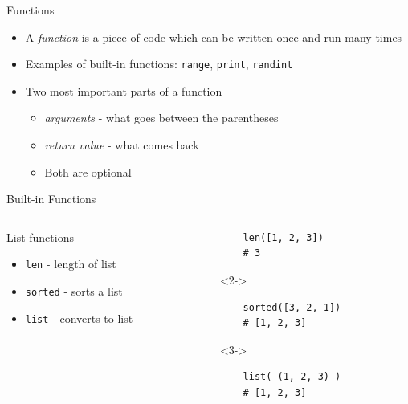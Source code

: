\documentclass{beamer}
\begin{document}
\begin{frame}{Functions}
    \begin{itemize}[<+->]
        \item A \textit{function} is a piece of code which can be written once and run many times
        \item Examples of built-in functions: \texttt{range}, \texttt{print}, \texttt{randint}
        \item Two most important parts of a function
            \begin{itemize}
                \item \textit{arguments} - what goes between the parentheses
                \item \textit{return value} - what comes back
                \item Both are optional
            \end{itemize}
    \end{itemize}
\end{frame}

\begin{frame}[fragile]{Built-in Functions}
    \begin{columns}
        \begin{column}{0.5\textwidth}
            List functions
            \begin{itemize}[<+->]
                \item \texttt{len} - length of list
                \item \texttt{sorted} - sorts a list
                \item \texttt{list} - converts to list 
            \end{itemize}
        \end{column}
        \begin{column}{0.5\textwidth}
        \small
\begin{block}{}
\begin{verbatim}
    len([1, 2, 3])
    # 3
\end{verbatim}
\end{block}
\vspace*{-1em}
\begin{block}<2->{}
\begin{verbatim}
    sorted([3, 2, 1])
    # [1, 2, 3]
\end{verbatim}
\end{block}
\begin{block}<3->{}
\vspace*{-1em}
\begin{verbatim}
    list( (1, 2, 3) )
    # [1, 2, 3]
\end{verbatim}
\end{block}
        \end{column}
    \end{columns}
\end{frame}
\end{document}
